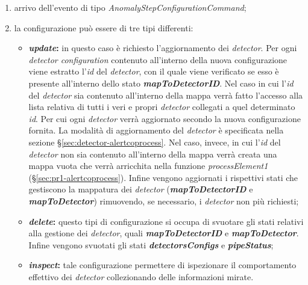 \begin{enumerate}
	\item{arrivo dell'evento di tipo \textit{AnomalyStepConfigurationCommand};}
	\item{la configurazione può essere di tre tipi differenti:
	\begin{itemize}
		\item{\textbf{\textit{update}:} in questo caso è richiesto l'aggiornamento dei \textit{detector}. Per ogni \textit{detector configuration} contenuto all'interno della nuova configurazione viene estratto l'\textit{id} del \textit{detector}, con il quale viene verificato se esso è presente all'interno dello stato \textbf{\textit{mapToDetectorID}}. Nel caso in cui l'\textit{id} del \textit{detector} sia contenuto all'interno della mappa verrà fatto l'accesso alla lista relativa di tutti i veri e propri \textit{detector} collegati a quel determinato \textit{id}. Per cui ogni \textit{detector} verrà aggiornato secondo la nuova configurazione fornita. La modalità di aggiornamento del \textit{detector} è specificata nella sezione \S\ref{sec:detector-alertcoprocess}. Nel caso, invece, in cui l'\textit{id} del \textit{detector} non sia contenuto all'interno della mappa verrà creata una mappa vuota che verrà arricchita nella funzione \textit{processElement1} (\S\ref{sec:pr1-alertcoprocess}). Infine vengono aggiornati i rispettivi stati che gestiscono la mappatura dei \textit{detector} (\textbf{\textit{mapToDetectorID}} e \textbf{\textit{mapToDetector}}) rimuovendo, se necessario, i \textit{detector} non più richiesti;}
		\item{\textbf{\textit{delete}:} questo tipi di configurazione si occupa di svuotare gli stati relativi alla gestione dei \textit{detector}, quali \textbf{\textit{mapToDetectorID}} e \textbf{\textit{mapToDetector}}. Infine vengono svuotati gli stati \textbf{\textit{detectorsConfigs}} e \textbf{\textit{pipeStatus}};}
		\item{\textbf{\textit{inspect}:} tale configurazione permettere di ispezionare il comportamento effettivo dei \textit{detector} collezionando delle informazioni mirate.}
	\end{itemize}}
\end{enumerate}


